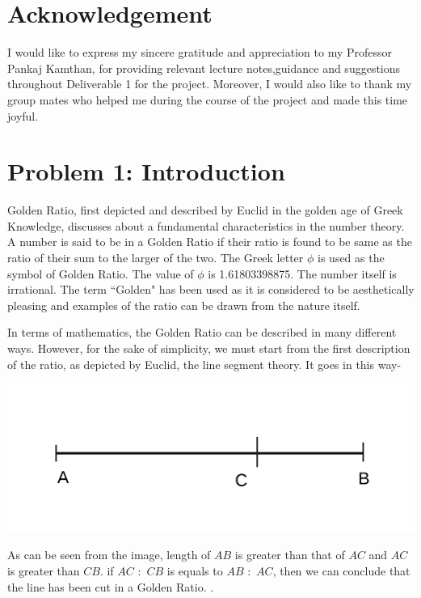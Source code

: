 \documentclass[12pt]{extarticle}
\begin{document}
\section{Acknowledgement}
I would like to express my sincere gratitude and appreciation to my Professor Pankaj Kamthan, for providing relevant lecture notes,guidance and suggestions throughout Deliverable 1 for the project.\newline\newline
Moreover, I would also like to thank my group mates who helped me during the course of the project and made this time joyful.
\newpage
\section{Problem 1: Introduction}
Golden Ratio, first depicted and described by Euclid in the golden age of Greek Knowledge, discusses about a fundamental characteristics in the number theory. A number is said to be in a Golden Ratio if their ratio is found to be same as the ratio of their sum to the larger of the two. The Greek letter $\phi$ is used as the symbol of Golden Ratio. The value of $\phi$ is 1.61803398875. The number itself is irrational. The term ``Golden" has been used as it is considered to be aesthetically pleasing and examples of the ratio can be drawn from the nature itself.

In terms of mathematics, the Golden Ratio can be described in many different ways. However, for the sake of simplicity, we must start from the first description of the ratio, as depicted by Euclid, the line segment theory. It goes in this way- 

\includegraphics[]{ffUntitled.png}

As can be seen from the image, length of $AB$ is greater than that of $AC$ and $AC$ is greater than $CB$. if $AC$ $:$ $CB$ is equals to $AB$ $:$ $AC$, then we can conclude that the line has been cut in a Golden Ratio. \cite{livio2008golden}. \newline
\end{document}
